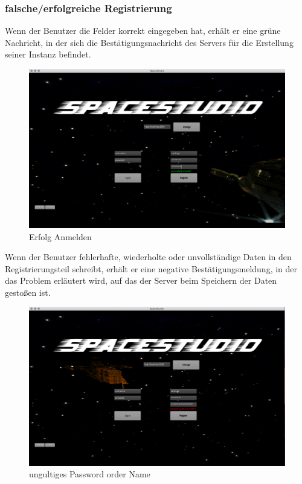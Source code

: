 \documentclass[11pt]{article}
\begin{document}
\subsubsection{falsche/erfolgreiche  Registrierung}
Wenn der Benutzer die Felder korrekt eingegeben hat, erhält er eine grüne Nachricht, in der sich die Bestätigungsnachricht des Servers für die Erstellung seiner Instanz befindet.\\
\begin{figure}[h]
\centering
\includegraphics[scale=0.3]{TestProtocolBilder/erfolgAnmelden.png}
\caption{Erfolg Anmelden}
\end{figure}

Wenn der Benutzer fehlerhafte, wiederholte oder unvollständige Daten in den Registrierungsteil schreibt, erhält er eine negative Bestätigungsmeldung, in der das Problem erläutert wird, auf das der Server beim Speichern der Daten gestoßen ist.\\
\begin{figure}[h]
\centering
\includegraphics[scale=0.3]{TestProtocolBilder/doesnotMatchPassword.png}
\caption{ungultiges Password order Name}
\end{figure}
\newpage
\end{document}
